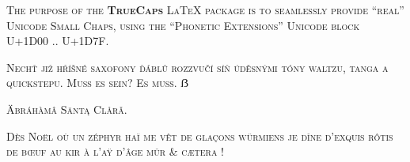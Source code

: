 \documentclass{scrartcl}
\begin{document}
\textsc{The purpose of the \textbf{TrueCaps} LaTeX package is to seamlessly provide “real” 
Unicode Small Chaps, using the “Phonetic Extensions” Unicode block U+1D00 .. U+1D7F.}

\textsc{Nechť již hříšné saxofony ďáblů rozzvučí síň úděsnými tóny waltzu, tanga a quickstepu. Muß es sein? Es muss. ẞ}

\textsc{Äbráhàmâ Säntą Clårǎ.}

\textsc{Dès Noël où un zéphyr haï me vêt de glaçons würmiens je dîne d’exquis rôtis de bœuf au kir à l’aÿ d’âge mûr \& cætera !}
\end{document}
